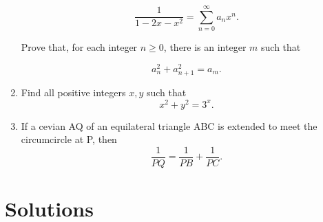 \documentclass{article}
\begin{document}
\begin{enumerate}
$$\frac{1}{1 - 2x -x^2} = \sum_{n = 0}^{\infty}a_n x^n.$$

Prove that, for each integer $n \geq 0$, there is an integer $m$ such that

$$a_n^2 + a_{n + 1}^2 = a_m.$$

\item Find all positive integers $x, y$ such that
$$
	x^2 + y^2 = 3^x.
$$

\item If a cevian AQ of an equilateral triangle ABC is extended to meet the circumcircle at P, then $$\frac{1}{PQ} = \frac{1}{PB} + \frac{1}{PC}.$$

\end{enumerate}

\section{Solutions}
\label{sec:Solutions}
\end{document}
